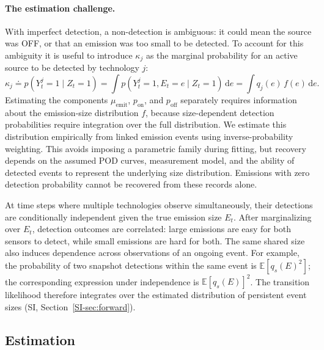 \documentclass[numsec,webpdf,modern,mediumone]{oup-authoring-template}
\begin{document}
\paragraph{The estimation challenge.}
With imperfect detection, a non-detection is ambiguous: it could mean the source was OFF, or that an emission was too small to be detected. To account for this ambiguity it is useful to introduce $\kappa_j$ as the marginal probability for an active source to be detected by technology $j$:
\begin{equation}
    \kappa_j
    \doteq p(Y_{t}^j=1\mid Z_t=1)
    = \int p(Y_{t}^j=1,E_t=e\mid Z_t=1)\,\mathrm{d}e
    = \int q_j(e)\,f(e)\,\mathrm{d}e.
    \label{eq:kappa}
\end{equation}
Estimating the components $\mu_{\text{emit}}$, $p_{\text{on}}$, and $p_{\text{off}}$ separately requires information about the emission-size distribution $f$, because size-dependent detection probabilities require integration over the full distribution. We estimate this distribution empirically from linked emission events using inverse-probability weighting. This avoids imposing a parametric family during fitting, but recovery depends on the assumed POD curves, measurement model, and the ability of detected events to represent the underlying size distribution. Emissions with zero detection probability cannot be recovered from these records alone.

At time steps where multiple technologies observe simultaneously, their detections are conditionally independent given the true emission size $E_t$. After marginalizing over $E_t$, detection outcomes are correlated: large emissions are easy for both sensors to detect, while small emissions are hard for both. The same shared size also induces dependence across observations of an ongoing event. For example, the probability of two snapshot detections within the same event is $\mathbb{E}[q_s(E)^2]$; the corresponding expression under independence is $\mathbb{E}[q_s(E)]^2$. The transition likelihood therefore integrates over the estimated distribution of persistent event sizes (SI, Section~\ref{SI-sec:forward}).


\subsection{Estimation}
\label{sec:estimation}
\end{document}
